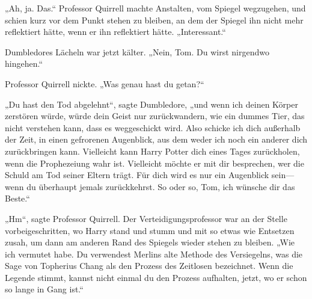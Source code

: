 „Ah, ja. Das.“
Professor Quirrell machte Anstalten, vom Spiegel wegzugehen, und schien kurz vor dem Punkt stehen zu bleiben, an dem der Spiegel ihn nicht mehr reflektiert hätte, wenn er ihn reflektiert hätte.
„Interessant.“

Dumbledores Lächeln war jetzt kälter.
„Nein, Tom. Du wirst nirgendwo hingehen.“

Professor Quirrell nickte. „Was genau hast du getan?“

„Du hast den Tod abgelehnt“, sagte Dumbledore,
„und wenn ich deinen Körper zerstören würde, würde dein Geist nur zurückwandern, wie ein dummes Tier, das nicht verstehen kann, dass es weggeschickt wird. Also schicke ich dich außerhalb der Zeit, in einen gefrorenen Augenblick, aus dem weder ich noch ein anderer dich zurückbringen kann. Vielleicht kann Harry Potter dich eines Tages zurückholen, wenn die Prophezeiung wahr ist. Vielleicht möchte er mit dir besprechen, wer die Schuld am Tod seiner Eltern trägt. Für dich wird es nur ein Augenblick sein—wenn du überhaupt jemals zurückkehrst. So oder so, Tom, ich wünsche dir das Beste.“

„Hm“, sagte Professor Quirrell.
Der Verteidigungsprofessor war an der Stelle vorbeigeschritten, wo Harry stand und stumm und mit so etwas wie Entsetzen zusah, um dann am anderen Rand des Spiegels wieder stehen zu bleiben.
„Wie ich vermutet habe. Du verwendest Merlins alte Methode des Versiegelns, was die Sage von Topherius Chang als den Prozess des Zeitlosen bezeichnet. Wenn die Legende stimmt, kannst nicht einmal du den Prozess aufhalten, jetzt, wo er schon so lange in Gang ist.“

